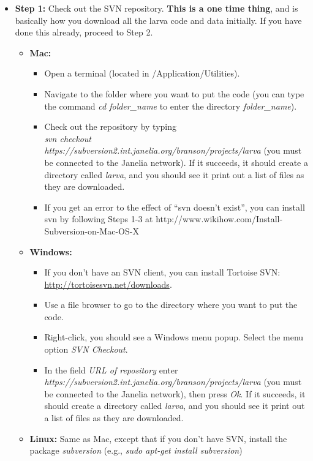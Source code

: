 \documentclass[10pt, onecolumn]{article}
\newcommand{\1}{\textbf{1}}
\begin{document}
\begin{itemize}
 \item \textbf{Step 1: } Check out the SVN repository.  \textbf{This is a one time thing}, and is basically how you download all the larva code and data initially.  If you have done this already, proceed to Step 2.
 \begin{itemize}
   \item \textbf{Mac:} \begin{itemize}
     \item Open a terminal (located in /Application/Utilities).  
     \item Navigate to the folder where you want to put the code (you can type the command \textit{cd folder\_name} to enter the directory \textit{folder\_name}). 
     \item Check out the repository by typing \\ \textit{svn checkout https://subversion2.int.janelia.org/branson/projects/larva} (you must be connected to the Janelia network).  If it succeeds, it should create a directory called \textit{larva}, and you should see it print out a list of files as they are downloaded.  
     \item If you get an error to the effect of ``svn doesn't exist'', you can install svn by following Steps 1-3 at http://www.wikihow.com/Install-Subversion-on-Mac-OS-X
   \end{itemize}
   \item \textbf{Windows: } \begin{itemize}
     \item If you don't have an SVN client, you can install Tortoise SVN: \url{http://tortoisesvn.net/downloads}.  
     \item Use a file browser to go to the directory where you want to put the code.  
     \item Right-click, you should see a Windows menu popup.  Select the menu option \textit{SVN Checkout}.  
     \item In the field \textit{URL of repository} enter\\ \textit{https://subversion2.int.janelia.org/branson/projects/larva} (you must be connected to the Janelia network), then press \textit{Ok}.  If it succeeds, it should create a directory called \textit{larva}, and you should see it print out a list of files as they are downloaded. 
   \end{itemize}
   \item \textbf{Linux: } Same as Mac, except that if you don't have SVN, install the package \textit{subversion} (e.g., \textit{sudo apt-get install subversion})

\end{itemize}
\end{itemize}
\end{document}
